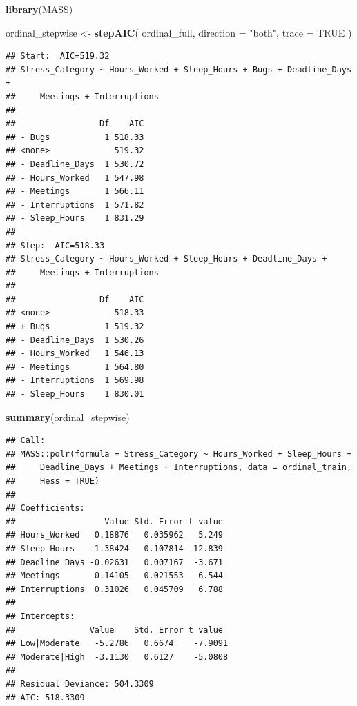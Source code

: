 \documentclass[
]{article}
\newenvironment{Shaded}{\begin{snugshade}}{\end{snugshade}}
\newcommand{\AttributeTok}[1]{\textcolor[rgb]{0.13,0.29,0.53}{#1}}
\newcommand{\ConstantTok}[1]{\textcolor[rgb]{0.56,0.35,0.01}{#1}}
\newcommand{\FunctionTok}[1]{\textcolor[rgb]{0.13,0.29,0.53}{\textbf{#1}}}
\newcommand{\NormalTok}[1]{#1}
\newcommand{\OtherTok}[1]{\textcolor[rgb]{0.56,0.35,0.01}{#1}}
\newcommand{\StringTok}[1]{\textcolor[rgb]{0.31,0.60,0.02}{#1}}
\begin{document}
\begin{Shaded}
\begin{Highlighting}[]
\FunctionTok{library}\NormalTok{(MASS)}

\NormalTok{ordinal\_stepwise }\OtherTok{\textless{}{-}} \FunctionTok{stepAIC}\NormalTok{(}
\NormalTok{  ordinal\_full,}
  \AttributeTok{direction =} \StringTok{"both"}\NormalTok{,}
  \AttributeTok{trace =} \ConstantTok{TRUE}
\NormalTok{)}
\end{Highlighting}
\end{Shaded}

\begin{verbatim}
## Start:  AIC=519.32
## Stress_Category ~ Hours_Worked + Sleep_Hours + Bugs + Deadline_Days + 
##     Meetings + Interruptions
## 
##                 Df    AIC
## - Bugs           1 518.33
## <none>             519.32
## - Deadline_Days  1 530.72
## - Hours_Worked   1 547.98
## - Meetings       1 566.11
## - Interruptions  1 571.82
## - Sleep_Hours    1 831.29
## 
## Step:  AIC=518.33
## Stress_Category ~ Hours_Worked + Sleep_Hours + Deadline_Days + 
##     Meetings + Interruptions
## 
##                 Df    AIC
## <none>             518.33
## + Bugs           1 519.32
## - Deadline_Days  1 530.26
## - Hours_Worked   1 546.13
## - Meetings       1 564.80
## - Interruptions  1 569.98
## - Sleep_Hours    1 830.01
\end{verbatim}

\begin{Shaded}
\begin{Highlighting}[]
\FunctionTok{summary}\NormalTok{(ordinal\_stepwise)}
\end{Highlighting}
\end{Shaded}

\begin{verbatim}
## Call:
## MASS::polr(formula = Stress_Category ~ Hours_Worked + Sleep_Hours + 
##     Deadline_Days + Meetings + Interruptions, data = ordinal_train, 
##     Hess = TRUE)
## 
## Coefficients:
##                  Value Std. Error t value
## Hours_Worked   0.18876   0.035962   5.249
## Sleep_Hours   -1.38424   0.107814 -12.839
## Deadline_Days -0.02631   0.007167  -3.671
## Meetings       0.14105   0.021553   6.544
## Interruptions  0.31026   0.045709   6.788
## 
## Intercepts:
##               Value    Std. Error t value 
## Low|Moderate   -5.2786   0.6674    -7.9091
## Moderate|High  -3.1130   0.6127    -5.0808
## 
## Residual Deviance: 504.3309 
## AIC: 518.3309
\end{verbatim}
\end{document}
